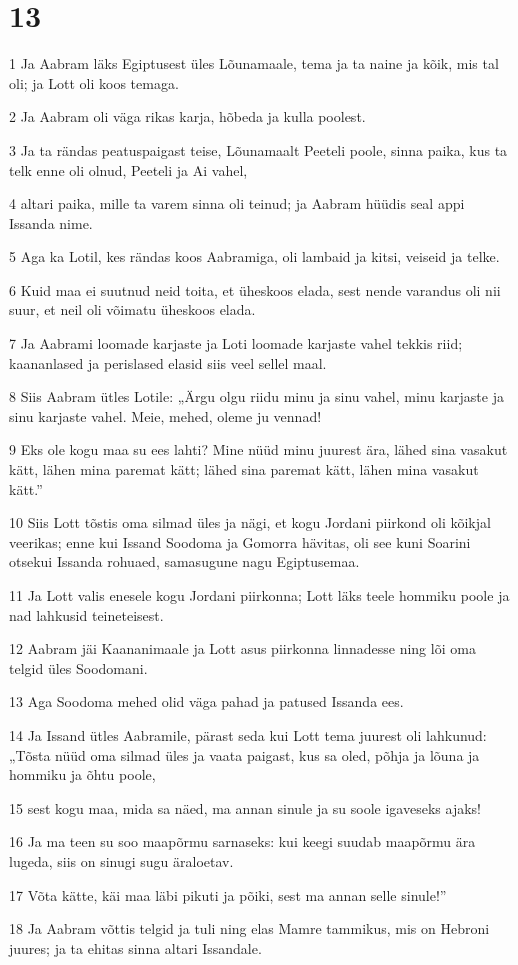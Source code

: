 \chapter{13}

\par 1 Ja Aabram läks Egiptusest üles Lõunamaale, tema ja ta naine ja kõik, mis tal oli; ja Lott oli koos temaga.
\par 2 Ja Aabram oli väga rikas karja, hõbeda ja kulla poolest.
\par 3 Ja ta rändas peatuspaigast teise, Lõunamaalt Peeteli poole, sinna paika, kus ta telk enne oli olnud, Peeteli ja Ai vahel,
\par 4 altari paika, mille ta varem sinna oli teinud; ja Aabram hüüdis seal appi Issanda nime.
\par 5 Aga ka Lotil, kes rändas koos Aabramiga, oli lambaid ja kitsi, veiseid ja telke.
\par 6 Kuid maa ei suutnud neid toita, et üheskoos elada, sest nende varandus oli nii suur, et neil oli võimatu üheskoos elada.
\par 7 Ja Aabrami loomade karjaste ja Loti loomade karjaste vahel tekkis riid; kaananlased ja perislased elasid siis veel sellel maal.
\par 8 Siis Aabram ütles Lotile: „Ärgu olgu riidu minu ja sinu vahel, minu karjaste ja sinu karjaste vahel. Meie, mehed, oleme ju vennad!
\par 9 Eks ole kogu maa su ees lahti? Mine nüüd minu juurest ära, lähed sina vasakut kätt, lähen mina paremat kätt; lähed sina paremat kätt, lähen mina vasakut kätt.”
\par 10 Siis Lott tõstis oma silmad üles ja nägi, et kogu Jordani piirkond oli kõikjal veerikas; enne kui Issand Soodoma ja Gomorra hävitas, oli see kuni Soarini otsekui Issanda rohuaed, samasugune nagu Egiptusemaa.
\par 11 Ja Lott valis enesele kogu Jordani piirkonna; Lott läks teele hommiku poole ja nad lahkusid teineteisest.
\par 12 Aabram jäi Kaananimaale ja Lott asus piirkonna linnadesse ning lõi oma telgid üles Soodomani.
\par 13 Aga Soodoma mehed olid väga pahad ja patused Issanda ees.
\par 14 Ja Issand ütles Aabramile, pärast seda kui Lott tema juurest oli lahkunud: „Tõsta nüüd oma silmad üles ja vaata paigast, kus sa oled, põhja ja lõuna ja hommiku ja õhtu poole,
\par 15 sest kogu maa, mida sa näed, ma annan sinule ja su soole igaveseks ajaks!
\par 16 Ja ma teen su soo maapõrmu sarnaseks: kui keegi suudab maapõrmu ära lugeda, siis on sinugi sugu äraloetav.
\par 17 Võta kätte, käi maa läbi pikuti ja põiki, sest ma annan selle sinule!”
\par 18 Ja Aabram võttis telgid ja tuli ning elas Mamre tammikus, mis on Hebroni juures; ja ta ehitas sinna altari Issandale.

